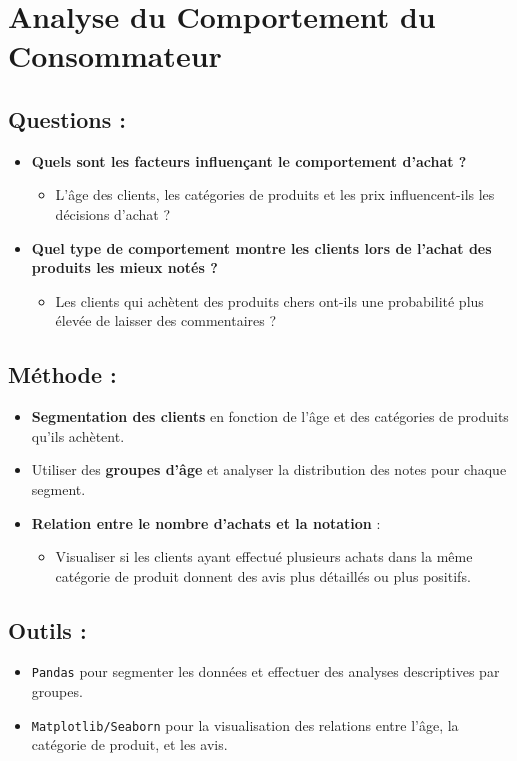 \documentclass{article}
\begin{document}
	\section{Analyse du Comportement du Consommateur}
	
	\subsection{Questions :}
	\begin{itemize}
		\item \textbf{Quels sont les facteurs influençant le comportement d'achat ?}
		\begin{itemize}
			\item L’âge des clients, les catégories de produits et les prix influencent-ils les décisions d'achat ?
		\end{itemize}
		
		\item \textbf{Quel type de comportement montre les clients lors de l'achat des produits les mieux notés ?}
		\begin{itemize}
			\item Les clients qui achètent des produits chers ont-ils une probabilité plus élevée de laisser des commentaires ?
		\end{itemize}
	\end{itemize}
	
	\subsection{Méthode :}
	\begin{itemize}
		\item \textbf{Segmentation des clients} en fonction de l'âge et des catégories de produits qu'ils achètent.
		\item Utiliser des \textbf{groupes d’âge} et analyser la distribution des notes pour chaque segment.
		\item \textbf{Relation entre le nombre d'achats et la notation} :
		\begin{itemize}
			\item Visualiser si les clients ayant effectué plusieurs achats dans la même catégorie de produit donnent des avis plus détaillés ou plus positifs.
		\end{itemize}
	\end{itemize}
	
	\subsection{Outils :}
	\begin{itemize}
		\item \texttt{Pandas} pour segmenter les données et effectuer des analyses descriptives par groupes.
		\item \texttt{Matplotlib/Seaborn} pour la visualisation des relations entre l’âge, la catégorie de produit, et les avis.
	\end{itemize}
	
\end{document}
